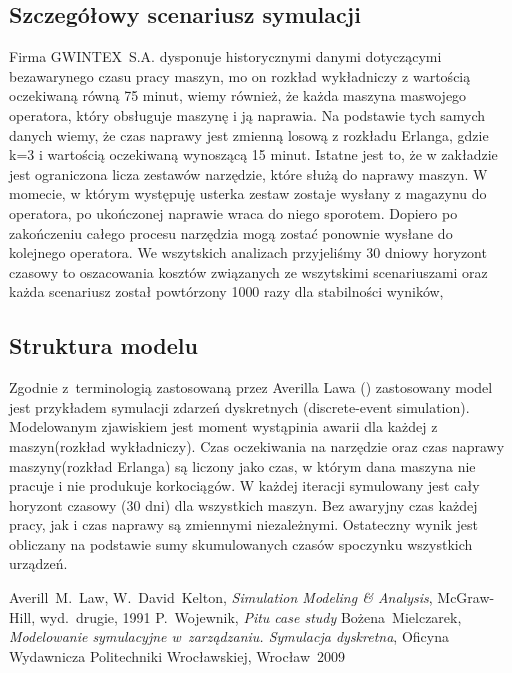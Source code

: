 \documentclass[12pt, a4paper, oneside]{mwart} %
\begin{document}
\subsection{Szczegółowy scenariusz symulacji}

Firma GWINTEX~S.A. dysponuje historycznymi danymi dotyczącymi bezawarynego czasu pracy maszyn, mo on rozkład wykładniczy z wartością oczekiwaną równą 75 minut, wiemy również, że każda maszyna maswojego operatora, który obsługuje maszynę i ją naprawia. Na podstawie tych samych danych wiemy, że czas naprawy jest zmienną losową z rozkładu Erlanga, gdzie k=3 i wartością oczekiwaną wynoszącą 15 minut. Istatne jest to, że w zakładzie jest ograniczona licza zestawów narzędzie, które służą do naprawy maszyn. W momecie, w którym występuję usterka zestaw zostaje wysłany z magazynu do operatora, po ukończonej naprawie wraca do niego sporotem. Dopiero po zakończeniu całego procesu narzędzia mogą zostać ponownie wysłane do kolejnego operatora. We wszytskich analizach przyjeliśmy 30 dniowy horyzont czasowy to oszacowania kosztów związanych ze wszytskimi scenariuszami oraz każda scenariusz został powtórzony 1000 razy dla stabilności wyników,

\subsection{Struktura modelu}
Zgodnie z~terminologią zastosowaną przez Averilla Lawa (\cite{law}) zastosowany model jest przykładem symulacji zdarzeń dyskretnych (discrete-event simulation). Modelowanym zjawiskiem jest moment wystąpinia awarii dla każdej z maszyn(rozkład wykładniczy). Czas oczekiwania na narzędzie oraz czas naprawy maszyny(rozkład Erlanga) są liczony jako czas, w którym dana maszyna nie pracuje i nie produkuje korkociągów. W każdej iteracji symulowany jest cały horyzont czasowy (30 dni) dla wszystkich maszyn. Bez awaryjny czas każdej pracy, jak i czas naprawy są zmiennymi niezależnymi. Ostateczny wynik jest obliczany na podstawie sumy skumulowanych czasów spoczynku wszystkich urządzeń.



\begin{thebibliography}{9}
Averill~M.~Law, W.~David~Kelton,
\emph{Simulation Modeling \& Analysis},
McGraw-Hill, wyd.~drugie, 1991
P.~Wojewnik, \emph{Pitu case study}
Bożena~Mielczarek, \emph{Modelowanie symulacyjne w~zarządzaniu. Symulacja dyskretna},
Oficyna Wydawnicza Politechniki Wrocławskiej, Wrocław~2009
\end{thebibliography}
\end{document}
